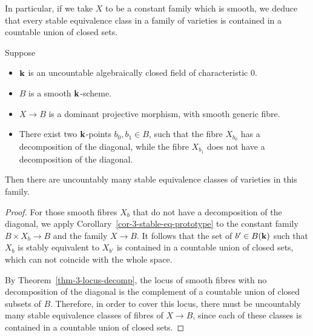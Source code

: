 In particular, if we take $X$ to be a constant family which is smooth,
we deduce that every stable equivalence class in a family of varieties is contained
in a countable union of closed sets.

\begin{corollary} \label{thm-3-stable-eq-class}
    Suppose 
    \begin{itemize}
        \item
            $\bbk$ is an uncountable algebraically closed field of characteristic $0$.
        \item
            $B$ is a smooth $\bbk$-scheme.
        \item
            $X \to B$ is a dominant projective morphism, with smooth generic fibre.
        \item
            There exist two $\bbk$-points $b_0, b_1 \in B$,
            such that the fibre $X_{b_0}$ has a decomposition of the diagonal,
            while the fibre $X_{b_1}$ does not have a decomposition of the diagonal.
    \end{itemize}
    Then there are uncountably many stable equivalence classes of varieties
    in this family.
\end{corollary}

\begin{proof}
    For those smooth fibres $X_b$ that do not have a decomposition of the diagonal,
    we apply Corollary~\ref{cor-3-stable-eq-prototype} to the constant family $B \times X_b \to B$ and the family $X \to B$.
    It follows that the set of $b' \in B(\bbk)$ such that $X_b$ is stably equivalent to $X_{b'}$
    is contained in a countable union of closed sets, which can not coincide with the whole space.

    By Theorem~\ref{thm-3-locus-decomp},
    the locus of smooth fibres with no decomposition of the diagonal 
    is the complement of a countable union of closed subsets of $B$.
    Therefore, in order to cover this locus, 
    there must be uncountably many stable equivalence classes of fibres of $X \to B$,
    since each of these classes is contained in a countable union of closed sets.
\end{proof}
